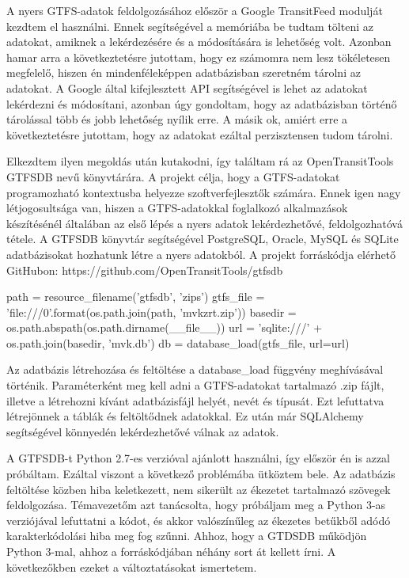 
A nyers GTFS-adatok feldolgozásához először a Google TransitFeed modulját kezdtem el használni. Ennek segítségével a memóriába be tudtam tölteni az adatokat, amiknek a lekérdezésére és a módosítására is lehetőség volt. Azonban hamar arra a következtetésre jutottam, hogy ez számomra nem lesz tökéletesen megfelelő, hiszen én mindenféleképpen adatbázisban szeretném tárolni az adatokat. A Google által kifejlesztett API segítségével is lehet az adatokat lekérdezni és módosítani, azonban úgy gondoltam, hogy az adatbázisban történő tárolással több és jobb lehetőség nyílik erre. A másik ok, amiért erre a következtetésre jutottam, hogy az adatokat ezáltal perzisztensen tudom tárolni.

Elkezdtem ilyen megoldás után kutakodni, így találtam rá az OpenTransitTools GTFSDB nevű könyvtárára. A projekt célja, hogy a GTFS-adatokat programozható kontextusba helyezze szoftverfejlesztők számára. Ennek igen nagy létjogosultsága van, hiszen a GTFS-adatokkal foglalkozó alkalmazások készítésénél általában az első lépés a nyers adatok lekérdezhetővé, feldolgozhatóvá tétele. A GTFSDB könyvtár segítségével PostgreSQL, Oracle, MySQL és SQLite adatbázisokat hozhatunk létre a nyers adatokból. A projekt forráskódja elérhető GitHubon: https://github.com/OpenTransitTools/gtfsdb

\begin{python}
path = resource_filename('gtfsdb', 'zips')
gtfs_file = 'file:///{0}'.format(os.path.join(path, 'mvkzrt.zip'))
basedir = os.path.abspath(os.path.dirname(__file__))
url = 'sqlite:///' + os.path.join(basedir, 'mvk.db')
db = database_load(gtfs_file, url=url)
\end{python}

Az adatbázis létrehozása és feltöltése a database\_load függvény meghívásával történik. Paraméterként meg kell adni a GTFS-adatokat tartalmazó .zip fájlt, illetve a létrehozni kívánt adatbázisfájl helyét, nevét és típusát. Ezt lefuttatva létrejönnek a táblák és feltöltődnek adatokkal. Ez után már SQLAlchemy segítségével könnyedén lekérdezhetővé válnak az adatok.

A GTFSDB-t Python 2.7-es verzióval ajánlott használni, így először én is azzal próbáltam. Ezáltal viszont a következő problémába ütköztem bele. Az adatbázis feltöltése közben hiba keletkezett, nem sikerült az ékezetet tartalmazó szövegek feldolgozása. Témavezetőm azt tanácsolta, hogy próbáljam meg a Python 3-as verziójával lefuttatni a kódot, és akkor valószínűleg az ékezetes betűkből adódó karakterkódolási hiba meg fog szűnni. Ahhoz, hogy a GTDSDB működjön Python 3-mal, ahhoz a forráskódjában néhány sort át kellett írni. A következőkben ezeket a változtatásokat ismertetem.

